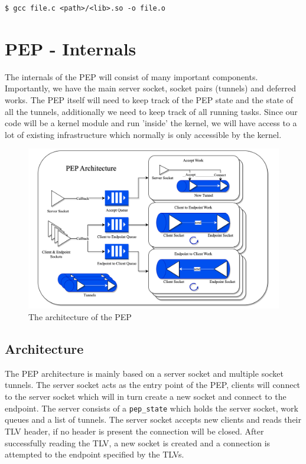 \documentclass[a4paper,english, 11pt]{report}
\begin{document}
\begin{verbatim}
$ gcc file.c <path>/<lib>.so -o file.o
\end{verbatim}

\section{PEP - Internals}
The internals of the PEP will consist of many important components. Importantly, we have the main server socket, socket pairs (tunnels) and deferred works. The PEP itself will need to keep track of the PEP state and the state of all the tunnels, additionally we need to keep track of all running tasks. Since our code will be a kernel module and run 'inside' the kernel, we will have access to a lot of existing infrastructure which normally is only accessible by the kernel. 

\begin{figure} %
	\centering
	\includegraphics[scale=0.35]{../diagrams/drawio/pep_architecture.png}
  	\caption{The architecture of the PEP}
  	\label{fig:pep_architecture}
\end{figure}

\subsection{Architecture}
The PEP architecture is mainly based on a server socket and multiple socket tunnels. The server socket acts as the entry point of the PEP, clients will connect to the server socket which will in turn create a new socket and connect to the endpoint. The server consists of a \verb|pep_state| which holds the server socket, work queues and a list of tunnels. The server socket accepts new clients and reads their TLV header, if no header is present the connection will be closed. After successfully reading the TLV, a new socket is created and a connection is attempted to the endpoint specified by the TLVs.\\
\end{document}
